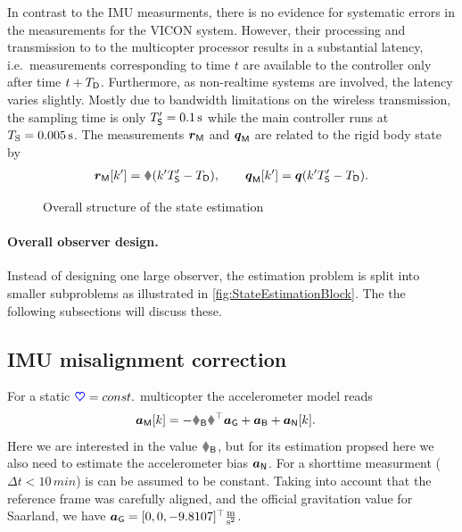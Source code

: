 In contrast to the IMU measurments, there is no evidence for systematic errors in the measurements for the VICON system.
However, their processing and transmission to to the multicopter processor results in a substantial latency, i.e.\ measurements corresponding to time $t$ are available to the controller only after time $t+T_{\mathsf{D}}$.
Furthermore, as non-realtime systems are involved, the latency varies slightly.
Mostly due to bandwidth limitations on the wireless transmission, the sampling time is only $T'_{\mathsf{S}}=0.1\,\text{s}$ while the main controller runs at $T_{\mathrm{S}}=0.005\,\text{s}$.
The measurements $\boldsymbol{r}_{\mathsf{M}}$ and $\boldsymbol{q}_{\mathsf{M}}$ are related to the rigid body state by
\begin{align}
 \rVIC[k'] = \r(k'\TsVIC - \TVICD),
\qquad
 \qVIC[k'] = \quat(k'\TsVIC - \TVICD).
\end{align}

\begin{figure}
 \centering
 
 \caption{Overall structure of the state estimation}
 \label{fig:StateEstimationBlock}
\end{figure}

\paragraph{Overall observer design.}
Instead of designing one large observer, the estimation problem is split into smaller subproblems as illustrated in \autoref{fig:StateEstimationBlock}.
The the following subsections will discuss these.




\subsection{IMU misalignment correction}
For a static $\boldsymbol{\textcolor{blue}{\heartsuit}}=const.$ multicopter the accelerometer model reads
\begin{align}
 \aIMU[k] &=  -\RIMUBR \R^\top \gravityAcc + \aIMUB + \aIMUN[k].
\end{align} 
Here we are interested in the value $\RIMUBR$, but for its estimation propsed here we also need to estimate the accelerometer bias $\boldsymbol{a}_{\mathsf{N}}$.
For a shorttime measurment ($\Delta t<10\,\unit{min}$) is can be assumed to be constant.
Taking into account that the reference frame was carefully aligned, and the official gravitation value for Saarland, we have $\boldsymbol{a}_{\mathsf{G}} = [0, 0, -9.8107]^\top \tfrac{\text{m}}{\text{s}^2}$.

